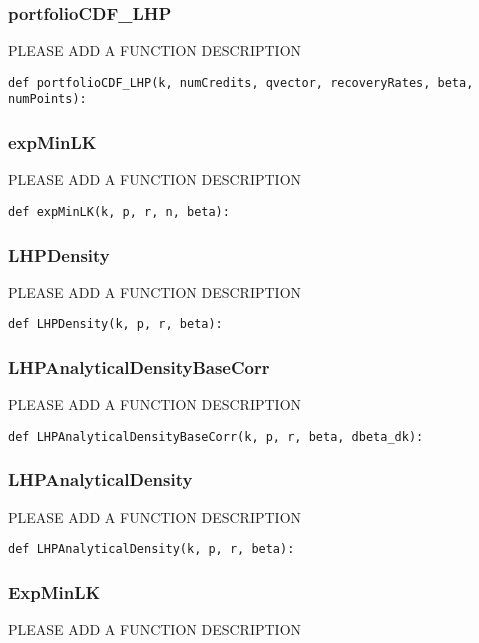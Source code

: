\documentclass[twoside,11pt]{book}
\begin{document}
\subsubsection*{{\bf portfolioCDF\_LHP}}
PLEASE ADD A FUNCTION DESCRIPTION

\begin{lstlisting}
def portfolioCDF_LHP(k, numCredits, qvector, recoveryRates, beta, numPoints):
\end{lstlisting}

\subsubsection*{{\bf expMinLK}}
PLEASE ADD A FUNCTION DESCRIPTION

\begin{lstlisting}
def expMinLK(k, p, r, n, beta):
\end{lstlisting}

\subsubsection*{{\bf LHPDensity}}
PLEASE ADD A FUNCTION DESCRIPTION

\begin{lstlisting}
def LHPDensity(k, p, r, beta):
\end{lstlisting}

\subsubsection*{{\bf LHPAnalyticalDensityBaseCorr}}
PLEASE ADD A FUNCTION DESCRIPTION

\begin{lstlisting}
def LHPAnalyticalDensityBaseCorr(k, p, r, beta, dbeta_dk):
\end{lstlisting}

\subsubsection*{{\bf LHPAnalyticalDensity}}
PLEASE ADD A FUNCTION DESCRIPTION

\begin{lstlisting}
def LHPAnalyticalDensity(k, p, r, beta):
\end{lstlisting}

\subsubsection*{{\bf ExpMinLK}}
PLEASE ADD A FUNCTION DESCRIPTION
\end{document}
